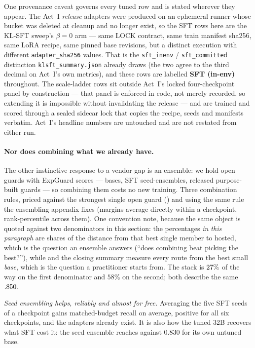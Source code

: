 \documentclass[11pt]{article}
\newcommand{\code}[1]{\texttt{\small #1}}
\begin{document}
One provenance caveat governs every tuned row and is stated wherever they appear. The Act~I
\emph{release} adapters were produced on an ephemeral runner whose bucket was deleted at
cleanup and no longer exist, so the SFT rows here are the KL-SFT sweep's $\beta=0$ arm ---
same LOCK contract, same train manifest sha256, same LoRA recipe, same pinned base revisions,
but a distinct execution with different \code{adapter\_sha256} values. That is the
\code{sft\_inenv} / \code{sft\_committed} distinction \code{klsft\_summary.json} already draws
(the two agree to the third decimal on Act~I's own metrics), and these rows are labelled
\textbf{SFT (in-env)} throughout. The scale-ladder rows sit outside Act~I's locked
four-checkpoint panel by construction --- that panel is enforced in code, not merely recorded,
so extending it is impossible without invalidating the release --- and are trained and scored
through a sealed sidecar lock that copies the recipe, seeds and manifests verbatim. Act~I's
headline numbers are untouched and are not restated from either run.

\paragraph{Nor does combining what we already have.} The other instinctive response to a
vendor gap is an ensemble: we hold \FrontierEnsMembers{} open guards with ExpGuard scores ---
bases, SFT seed-ensembles, released purpose-built guards --- so combining them costs no new
training. Three combination rules, priced against the strongest single open guard
(\FrontierEnsBestSingle) and using the same rule the ensembling appendix fixes (margins average
directly within a checkpoint, rank-percentile across them). One convention note, because the same
object is quoted against two denominators in this section: the percentages \emph{in this paragraph}
are shares of the distance from that best single member to hosted, which is the question an ensemble
answers (``does combining beat picking the best?''), while  and the closing
summary measure every route from the best small \emph{base}, which is the question a practitioner
starts from. The stack is $27\%$ of the way on the first denominator and $58\%$
on the second; both describe the same $.850$.

\emph{Seed ensembling helps, reliably and almost for free.} Averaging the five SFT seeds of a
checkpoint gains \FrontierEnsSeedGain{} matched-budget recall on average, positive for all six
checkpoints, and the adapters already exist. It is also how the tuned 32B recovers what SFT cost
it: the seed ensemble reaches \FrontierEnsBestSingle{} against $0.830$ for its own untuned base.
\end{document}
